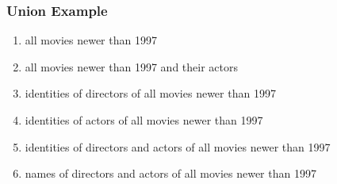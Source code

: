 \documentclass[dvipsnames]{beamer}
\theoremstyle{plain}
\begin{document}
\begin{frame}
  \frametitle{Union Example}

  \begin{example}
    \pause
    \begin{enumerate}
      \item all movies newer than 1997

      \pause
      \item all movies newer than 1997 and their actors

      \pause
      \item identities of directors of all movies newer than 1997

      \pause
      \item identities of actors of all movies newer than 1997

      \pause
      \item identities of directors and actors of all movies newer than 1997

      \pause
      \item names of directors and actors of all movies newer than 1997
    \end{enumerate}
  \end{example}
\end{frame}
\end{document}
